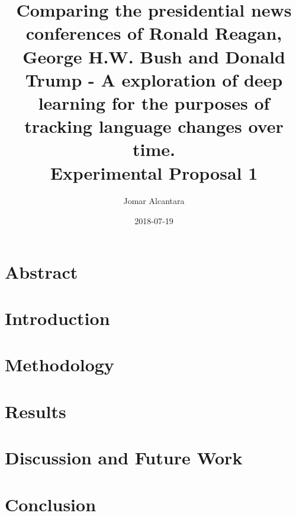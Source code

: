 \documentclass{article}
\title{Comparing the presidential news conferences of Ronald Reagan, George H.W. Bush and Donald Trump - A exploration of deep learning for the purposes of tracking language changes over time.\newline \\\large Experimental Proposal 1 }
\date{2018-07-19}
\author{Jomar Alcantara}
\begin{document}
\maketitle
\newpage
\tableofcontents
\newpage
\section{Abstract}
\section{Introduction}
\section{Methodology}
\section{Results}
\section{Discussion and Future Work}
\section{Conclusion}


\end{document}
